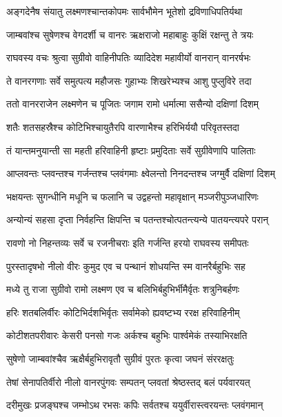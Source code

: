 \twolineshloka
{अङ्गदेनैष संयातु लक्ष्मणश्चान्तकोपमः}
{सार्वभौमेन भूतेशो द्रविणाधिपतिर्यथा} %

\twolineshloka
{जाम्बवांश्च सुषेणश्च वेगदर्शी च वानरः}
{ऋक्षराजो महाबाहुः कुक्षिं रक्षन्तु ते त्रयः} %

\twolineshloka
{राघवस्य वचः श्रुत्वा सुग्रीवो वाहिनीपतिः}
{व्यादिदेश महावीर्यो वानरान् वानरर्षभः} %

\twolineshloka
{ते वानरगणाः सर्वे समुत्पत्य महौजसः}
{गुहाभ्यः शिखरेभ्यश्च आशु पुप्लुविरे तदा} %

\twolineshloka
{ततो वानरराजेन लक्ष्मणेन च पूजितः}
{जगाम रामो धर्मात्मा ससैन्यो दक्षिणां दिशम्} %

\twolineshloka
{शतैः शतसहस्रैश्च कोटिभिश्चायुतैरपि}
{वारणाभैश्च हरिभिर्ययौ परिवृतस्तदा} %

\twolineshloka
{तं यान्तमनुयान्ती सा महती हरिवाहिनी}
{हृष्टाः प्रमुदिताः सर्वे सुग्रीवेणापि पालिताः} %

\twolineshloka
{आप्लवन्तः प्लवन्तश्च गर्जन्तश्च प्लवंगमाः}
{क्ष्वेलन्तो निनदन्तश्च जग्मुर्वै दक्षिणां दिशम्} %

\twolineshloka
{भक्षयन्तः सुगन्धीनि मधूनि च फलानि च}
{उद्वहन्तो महावृक्षान् मञ्जरीपुञ्जधारिणः} %

\twolineshloka
{अन्योन्यं सहसा दृप्ता निर्वहन्ति क्षिपन्ति च}
{पतन्तश्चोत्पतन्त्यन्ये पातयन्त्यपरे परान्} %

\twolineshloka
{रावणो नो निहन्तव्यः सर्वे च रजनीचराः}
{इति गर्जन्ति हरयो राघवस्य समीपतः} %

\twolineshloka
{पुरस्तादृषभो नीलो वीरः कुमुद एव च}
{पन्थानं शोधयन्ति स्म वानरैर्बहुभिः सह} %

\twolineshloka
{मध्ये तु राजा सुग्रीवो रामो लक्ष्मण एव च}
{बलिभिर्बहुभिर्भीमैर्वृतः शत्रुनिबर्हणः} %

\twolineshloka
{हरिः शतबलिर्वीरः कोटिभिर्दशभिर्वृतः}
{सर्वामेको ह्यवष्टभ्य ररक्ष हरिवाहिनीम्} %

\twolineshloka
{कोटीशतपरीवारः केसरी पनसो गजः}
{अर्कश्च बहुभिः पार्श्वमेकं तस्याभिरक्षति} %

\twolineshloka
{सुषेणो जाम्बवांश्चैव ऋक्षैर्बहुभिरावृतौ}
{सुग्रीवं पुरतः कृत्वा जघनं संररक्षतुः} %

\twolineshloka
{तेषां सेनापतिर्वीरो नीलो वानरपुंगवः}
{सम्पतन् प्लवतां श्रेष्ठस्तद् बलं पर्यवारयत्} %

\twolineshloka
{दरीमुखः प्रजङ्घश्च जम्भोऽथ रभसः कपिः}
{सर्वतश्च ययुर्वीरास्त्वरयन्तः प्लवंगमान्} %

